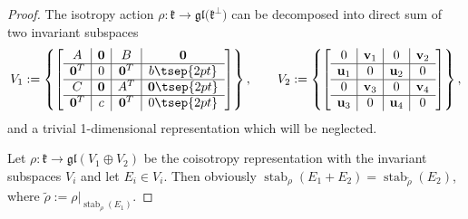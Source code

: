 \documentclass[pdftex]{sigma}
\numberwithin{equation}{section}
\begin{document}
\begin{proof}
The isotropy action $\rho\colon \mathfrak{k} \to \mathfrak{gl}\big( \mathfrak{k}^{\perp}\big)$ can be decomposed into direct sum of two invariant subspaces
\begin{gather*}
V_1:=\left\{
\left[
\begin{array}{c|c|c|c}
A & \mathbf{0} & B & \mathbf{0} \\ \hline
\mathbf{0}^T & 0 & \mathbf{0}^T & b\tsep{2pt} \\ \hline
C & \mathbf{0} & A^T & \mathbf{0} \tsep{2pt}\\ \hline
\mathbf{0}^T & c & \mathbf{0}^T & 0\tsep{2pt}
\end{array}
\right] \right\}, \qquad V_2:=\left\{
\left[
\begin{array}{c|c|c|c}
0 & \mathbf{v}_1 & 0 & \mathbf{v}_2 \\ \hline
\mathbf{u}_1 & 0 & \mathbf{u}_2 & 0 \\ \hline
0 & \mathbf{v}_3 & 0 & \mathbf{v}_4 \\ \hline
\mathbf{u}_3 & 0 & \mathbf{u}_4 & 0
\end{array}
\right]\right\},\end{gather*} and a trivial 1-dimensional representation which will be neglected.

Let $\rho\colon \mathfrak{k} \rightarrow \mathfrak{gl}(V_1 \oplus V_2 )$ be the coisotropy representation with the invariant subspaces $V_i$ and let $E_i\in V_i$.
Then obviously $\operatorname{stab}_{\rho}(E_1+E_2)= \operatorname{stab}_{\tilde{\rho}}(E_2)$, where $\tilde{\rho}:=\rho|_{\operatorname{stab}_{\rho}(E_1)}$.


\end{proof}
\end{document}
